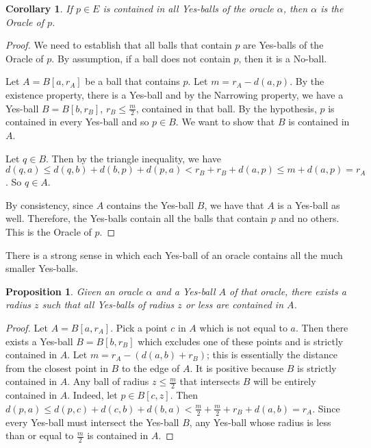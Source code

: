 \documentclass[12pt]{article}
\newtheorem{corollary}{Corollary}[section]
\newtheorem{proposition}{Proposition}[section]
\begin{document}
\begin{corollary}
If $p \in E$ is contained in all Yes-balls of the oracle $\alpha$, then $\alpha$ is the Oracle of $p$. 
\end{corollary}

\begin{proof}
We need to establish that all balls that contain $p$ are Yes-balls of the Oracle of $p$. By assumption, if a ball does not contain $p$, then it is a No-ball. 

Let $A = B[a, r_A]$ be a ball that contains $p$. Let $m = r_A - d(a,p)$. By the existence property, there is a Yes-ball and by the Narrowing property, we have a Yes-ball $B = B[b, r_B]$, $r_B \leq \frac{m}{2}$, contained in that ball. By the hypothesis, $p$ is contained in every Yes-ball and so $p \in B$. We want to show that $B$ is contained in $A$. 

Let $q \in B$. Then by the triangle inequality, we have $d(q, a) \leq d(q, b) + d(b, p) +  d(p,a) < r_B + r_B + d(a,p) \leq m + d(a,p) = r_A$. So $q \in A$. 

By consistency, since $A$ contains the Yes-ball $B$, we have that $A$ is a Yes-ball as well. Therefore, the Yes-balls contain all the balls that contain $p$ and no others. This is the Oracle of $p$. 
\end{proof}



There is a strong sense in which each Yes-ball of an oracle contains all the much smaller Yes-balls. 

\begin{proposition}
    Given an oracle $\alpha$ and a Yes-ball $A$ of that oracle, there exists a radius $z$ such that all Yes-balls of radius $z$ or less are contained in $A$. 
\end{proposition}

\begin{proof}
Let $A = B[a, r_A]$. Pick a point $c$ in $A$ which is not equal to $a$. Then there exists a Yes-ball $B = B[b,r_B]$ which excludes one of these points and is strictly contained in $A$. Let $m = r_A - (d(a,b) + r_B)$; this is essentially the distance from the closest point in $B$ to the edge of $A$. It is positive because $B$ is strictly contained in $A$.  Any ball of radius $z \leq \frac{m}{2}$ that intersects $B$ will be entirely contained in $A$. Indeed, let $p \in B[c, z]$. Then $d(p, a) \leq d(p, c) + d(c, b) + d(b, a) < \frac{m}{2} + \frac{m}{2}+ r_B + d(a,b) = r_A$. Since every Yes-ball must intersect the Yes-ball $B$, any Yes-ball whose radius is less than or equal to $\frac{m}{2}$ is contained in $A$. 
\end{proof}
\end{document}
